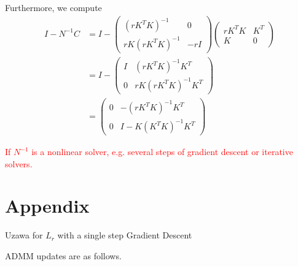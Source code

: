 Furthermore, we compute 
\begin{equation}
\begin{aligned}
      I - N^{-1} C & = I - \begin{pmatrix}
     (r K^T K)^{-1} &  0 \\
    r K (r K^T K)^{-1} & -r I
    \end{pmatrix} \begin{pmatrix}
    r K^TK & K^T \\
    K & 0
    \end{pmatrix} \\
    & = I - \begin{pmatrix}
    I &   (r K^T K)^{-1} K^T\\
     0 &  rK(rK^TK)^{-1}K^T 
    \end{pmatrix}\\
    & = \begin{pmatrix}
    0 & - (r K^T K)^{-1} K^T\\
    0 & I - K(K^TK)^{-1}K^T
    \end{pmatrix}
\end{aligned}
\end{equation}



\textcolor{red}{If $N^{-1}$ is a nonlinear solver, e.g. several steps of gradient descent or iterative solvers. 
}
 
\section{Appendix} 



 
\begin{algorithm}\label{alginexact4} \caption{Uzawa for $L_r$ with a single step Gradient Descent}
ADMM updates are as follows. 
\begin{algorithmic}
\EndFor
\end{algorithmic}
\end{algorithm}

